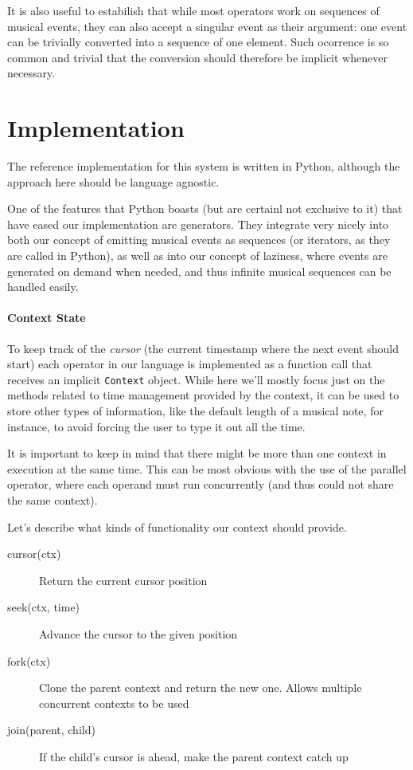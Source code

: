 \documentclass[a4paper,UKenglish,cleveref, autoref]{oasics-v2019}
\begin{document}
It is also useful to estabilish that while most operators work on sequences of musical events, they can also accept a singular event as their argument: one event can be trivially converted into a sequence of one element. Such ocorrence is so common and trivial that the conversion should therefore be implicit whenever necessary.

\section{Implementation}
The reference implementation for this system is written in Python, although the approach here should be language agnostic.

One of the features that Python boasts (but are certainl not exclusive to it) that have eased our implementation are generators\cite{PEP255}. They integrate very nicely into both our concept of emitting musical events as sequences (or iterators, as they are called in Python), as well as into our concept of laziness, where events are generated on demand when needed, and thus infinite musical sequences can be handled easily.

\paragraph*{Context State}
To keep track of the \textit{cursor} (the current timestamp where the next event should start) each operator in our language is implemented as a function call that receives an implicit \texttt{Context} object. While here we'll mostly focus just on the methods related to time management provided by the context, it can be used to store other types of information, like the default length of a musical note, for instance, to avoid forcing the user to type it out all the time.

It is important to keep in mind that there might be more than one context in execution at the same time. This can be most obvious with the use of the parallel operator, where each operand must run concurrently (and thus could not share the same context).

Let's describe what kinds of functionality our context should provide.

\begin{description}
    \item[cursor(ctx)] Return the current cursor position
    \item[seek(ctx, time)] Advance the cursor to the given position
    \item[fork(ctx)] Clone the parent context and return the new one. Allows multiple concurrent contexts to be used
    \item[join(parent, child)] If the child's cursor is ahead, make the parent context catch up
\end{description}
\end{document}

